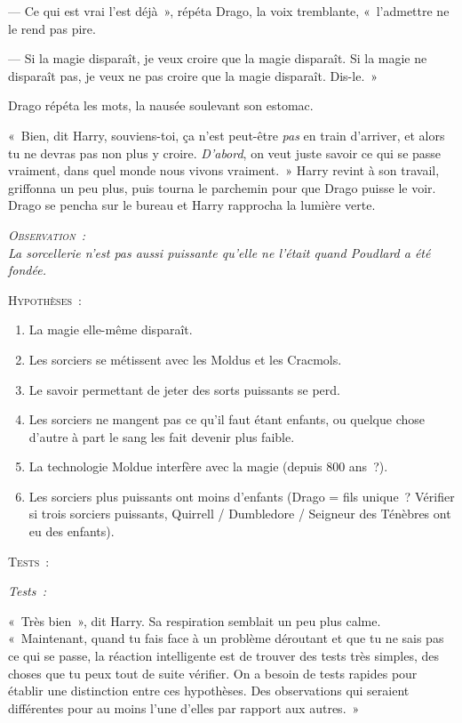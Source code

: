 --- Ce qui est vrai l'est déjà~», répéta Drago, la voix tremblante, «~l'admettre ne le rend pas pire.

--- Si la magie disparaît, je veux croire que la magie disparaît. Si la magie ne disparaît pas, je veux ne pas croire que la magie disparaît. Dis-le.~»

Drago répéta les mots, la nausée soulevant son estomac.

«~Bien, dit Harry, souviens-toi, ça n'est peut-être \emph{pas} en train d'arriver, et alors tu ne devras pas non plus y croire. \emph{D'abord}, on veut juste savoir ce qui se passe vraiment, dans quel monde nous vivons vraiment.~» Harry revint à son travail, griffonna un peu plus, puis tourna le parchemin pour que Drago puisse le voir. Drago se pencha sur le bureau et Harry rapprocha la lumière verte.

\begin{center}\itshape
{\scshape Observation~:}\\
La sorcellerie n'est pas aussi puissante qu'elle ne l'était quand Poudlard a été fondée. 

{\scshape Hypothèses~:}
\begin{enumerate}[1.]\firmlist
\item La magie elle-même disparaît.
\item Les sorciers se métissent avec les Moldus et les Cracmols.
\item Le savoir permettant de jeter des sorts puissants se perd.
\item Les sorciers ne mangent pas ce qu'il faut étant enfants, ou quelque chose d'autre à part le sang les fait devenir plus faible.
\item La technologie Moldue interfère avec la magie (depuis 800 ans~?).
\item Les sorciers plus puissants ont moins d'enfants (Drago = fils unique~? Vérifier si trois sorciers puissants, Quirrell / Dumbledore / Seigneur des Ténèbres ont eu des enfants). \end{enumerate} {\scshape Tests~:} \end{center}

\emph{{Tests~:}}

«~Très bien~», dit Harry. Sa respiration semblait un peu plus calme. «~Maintenant, quand tu fais face à un problème déroutant et que tu ne sais pas ce qui se passe, la réaction intelligente est de trouver des tests très simples, des choses que tu peux tout de suite vérifier. On a besoin de tests rapides pour établir une distinction entre ces hypothèses. Des observations qui seraient différentes pour au moins l'une d'elles par rapport aux autres.~»

